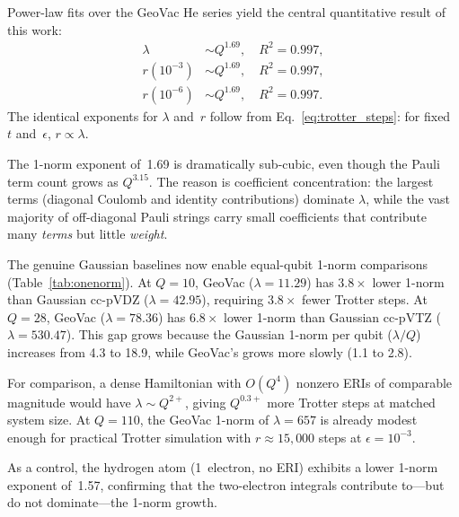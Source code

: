 \documentclass[aps,pra,twocolumn,superscriptaddress,longbibliography]{revtex4-2}
\begin{document}
Power-law fits over the GeoVac He series yield the central quantitative
result of this work:
\begin{align}
  \lambda       &\sim Q^{1.69}, \quad R^2 = 0.997, \label{eq:onenorm_exp} \\
  r(10^{-3})    &\sim Q^{1.69}, \quad R^2 = 0.997, \label{eq:trotter3_exp} \\
  r(10^{-6})    &\sim Q^{1.69}, \quad R^2 = 0.997. \label{eq:trotter6_exp}
\end{align}
The identical exponents for $\lambda$ and~$r$ follow from
Eq.~\eqref{eq:trotter_steps}: for fixed~$t$ and~$\epsilon$,
$r \propto \lambda$.

The 1-norm exponent of~1.69 is dramatically sub-cubic, even though the
Pauli term count grows as $Q^{3.15}$.  The reason is coefficient
concentration: the largest terms (diagonal Coulomb and identity
contributions) dominate $\lambda$, while the vast majority of
off-diagonal Pauli strings carry small coefficients that contribute
many \emph{terms} but little \emph{weight}.

The genuine Gaussian baselines now enable equal-qubit 1-norm
comparisons (Table~\ref{tab:onenorm}).  At $Q = 10$, GeoVac
($\lambda = 11.29$) has $3.8\times$ lower 1-norm than Gaussian
cc-pVDZ ($\lambda = 42.95$), requiring $3.8\times$ fewer Trotter
steps.  At $Q = 28$, GeoVac ($\lambda = 78.36$) has $6.8\times$
lower 1-norm than Gaussian cc-pVTZ ($\lambda = 530.47$).  This
gap grows because the Gaussian 1-norm per qubit ($\lambda/Q$)
increases from 4.3 to 18.9, while GeoVac's grows more slowly (1.1 to
2.8).

For comparison, a dense Hamiltonian with $O(Q^4)$ nonzero ERIs of
comparable magnitude would have $\lambda \sim Q^{2+}$, giving
$Q^{0.3+}$ more Trotter steps at matched system size.  At
$Q = 110$, the GeoVac 1-norm of $\lambda = 657$ is already modest
enough for practical Trotter simulation with $r \approx 15{,}000$
steps at $\epsilon = 10^{-3}$.

As a control, the hydrogen atom (1~electron, no ERI) exhibits a
lower 1-norm exponent of~1.57, confirming that the two-electron
integrals contribute to---but do not dominate---the 1-norm growth.
\end{document}
